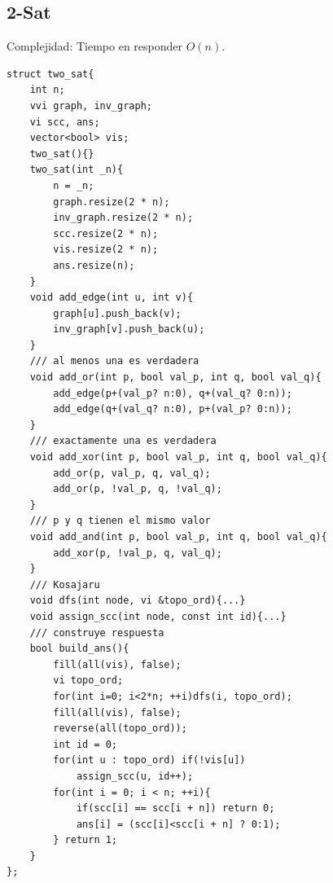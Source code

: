 \documentclass[12 pts,spanish,mexico]{article}
\numberwithin{equation}{section}
\begin{document}
\begin{multicols}{2}
\subsection{2-Sat}
Complejidad: Tiempo en responder $O(n)$.
\begin{verbatim}
struct two_sat{
    int n;
    vvi graph, inv_graph;
    vi scc, ans;
    vector<bool> vis;
    two_sat(){}
    two_sat(int _n){
        n = _n;
        graph.resize(2 * n);
        inv_graph.resize(2 * n);
        scc.resize(2 * n);
        vis.resize(2 * n);
        ans.resize(n);
    }
    void add_edge(int u, int v){
        graph[u].push_back(v);
        inv_graph[v].push_back(u);
    }
    /// al menos una es verdadera
    void add_or(int p, bool val_p, int q, bool val_q){
        add_edge(p+(val_p? n:0), q+(val_q? 0:n));
        add_edge(q+(val_q? n:0), p+(val_p? 0:n));
    }
    /// exactamente una es verdadera
    void add_xor(int p, bool val_p, int q, bool val_q){
        add_or(p, val_p, q, val_q);
        add_or(p, !val_p, q, !val_q);
    }
    /// p y q tienen el mismo valor
    void add_and(int p, bool val_p, int q, bool val_q){
        add_xor(p, !val_p, q, val_q);
    }
    /// Kosajaru
    void dfs(int node, vi &topo_ord){...}
    void assign_scc(int node, const int id){...}
    /// construye respuesta
    bool build_ans(){
        fill(all(vis), false);
        vi topo_ord;
        for(int i=0; i<2*n; ++i)dfs(i, topo_ord);
        fill(all(vis), false);
        reverse(all(topo_ord));
        int id = 0;
        for(int u : topo_ord) if(!vis[u])
            assign_scc(u, id++);
        for(int i = 0; i < n; ++i){
            if(scc[i] == scc[i + n]) return 0;
            ans[i] = (scc[i]<scc[i + n] ? 0:1);
        } return 1;
    }
};
\end{verbatim}


\end{multicols}
\end{document}
